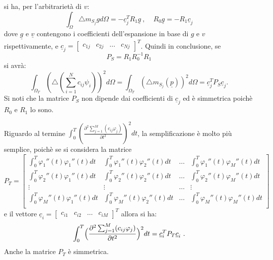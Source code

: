 \documentclass[a4paper,11pt,twoside,openright]{book}							%
\begin{document}
si ha, per l'arbitrarietà di $v$: 
$$ \int_\Omega \triangle m_{S_j} g d \Omega= - \underline c_j^T R_1 \underline g \ , \ \ \ \ \ R_0 \underline g = - R_1 \underline c_j  $$
dove $\underline g$ e $\underline v$ contengono i coefficienti dell'espansione in base di $g$ e $v$ rispettivamente, e $\underline c_j =
\begin{bmatrix}
c_{1j} & c_{2j} & \hdots & c_{Nj}
\end{bmatrix}^T$.
Quindi in conclusione, se 
$$
P_S = R_1 R_0^{-1} R_1
$$
si avrà:
$$
\int_{\Omega_T} ( \triangle(\sum_{i=1}^N  c_{ij}\psi_i ) )^2 d \Omega = \int_{\Omega_T} (\triangle m_{S_j}(\underline p))^2 d \Omega  =\underline c^T_j P_S \underline c_j .
$$
Si noti che la matrice $P_S$ non dipende dai coefficienti di $\underline c_j$ ed è simmetrica poichè $R_0$ e $R_1$ lo sono.

Riguardo al termine $\int_0^T (\frac{\partial^2 \sum_{j=1}^M(c_{ij}\varphi_j) }{\partial t ^2} )^2 dt$, la semplificazione è molto più semplice, poichè se si considera la matrice
 $$ P_T = \begin{bmatrix}
\int_0^T \varphi_1''(t) \varphi_1''(t) dt  & \int_0^T \varphi_1''(t) \varphi_2''(t) dt & \hdots & \int_0^T \varphi_1''(t) \varphi_M''(t) dt  \\
\int_0^T \varphi_2''(t) \varphi_1''(t) dt  & \int_0^T \varphi_2''(t) \varphi_2''(t) dt & \hdots & \int_0^T \varphi_2''(t) \varphi_M''(t) dt  \\
\vdots & \vdots & \hdots & \vdots \\
\int_0^T \varphi_M''(t) \varphi_1''(t) dt  & \int_0^T \varphi_M''(t) \varphi_2''(t) dt & \hdots & \int_0^T \varphi_M''(t) \varphi_M''(t) dt  \\
\end{bmatrix} $$
e il vettore $
\underline c_i =
\begin{bmatrix}
c_{i1} & c_{i2} & \hdots & c_{iM}
\end{bmatrix}^T$ allora si ha:
$$
\int_0^T \Bigl( \frac{\partial^2 \sum_{j=1}^M(c_{ij}\varphi_j) }{\partial t ^2} \Bigr)^2 dt =\underline c_i^T  P_T \underline c_i \ .
$$
Anche la matrice $P_T$ è simmetrica.
\end{document}
